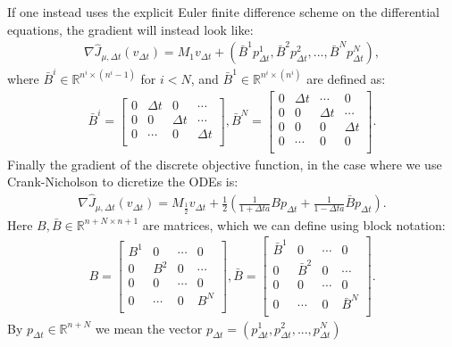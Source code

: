 \begin{theorem}
If one instead uses the explicit Euler finite difference scheme on the differential equations, the gradient will instead look like:
\begin{align}
\nabla\hat J_{\mu,\Delta t}(v_{\Delta t})= M_{1}v_{\Delta t} + (\bar B^1p_{\Delta t}^1,\bar B^2p_{\Delta t}^2,...,\bar B^Np_{\Delta t}^N),
\end{align}
where $\bar B^i\in \mathbb{R}^{n^i\times (n^i-1)}$ for $i<N$, and $\bar B^1\in \mathbb{R}^{n^i\times (n^i)}$ are defined as:
\begin{align*}
\bar B^i = \left[ \begin{array}{cccc}  
   0 &\Delta t& 0 & \cdots  \\ 
   0 &0 & \Delta t  & \cdots \\
   0 &\cdots &  0& \Delta t   \\
   \end{array}  \right] ,
\bar B^N = \left[ \begin{array}{cccc}
   0& \Delta t & \cdots & 0 \\  
   0& 0 & \Delta t & \cdots \\ 
   0 & 0& 0  & \Delta t \\
   0 &\cdots & 0& 0   \\
   \end{array}  \right].   
\end{align*}
Finally the gradient of the discrete objective function, in the case where we use Crank-Nicholson to dicretize the ODEs is:
\begin{align*}
\nabla\hat J_{\mu,\Delta t}(v_{\Delta t})= M_{\frac{1}{2}}v_{\Delta t} + \frac{1}{2}(\frac{1}{1+\Delta t a} Bp_{\Delta t} + \frac{1}{1-\Delta t a}\bar{B}p_{\Delta t}).
\end{align*}  
Here $B,\bar{B}\in\mathbb{R}^{n+N\times n+1}$ are matrices, which we can define using block notation:
\begin{align*}
B = \left[ \begin{array}{cccc}
   B^1& 0 & \cdots & 0 \\  
   0& B^2 & 0 & \cdots \\ 
   0 & 0& \cdots  & 0 \\
   0 &\cdots & 0& B^N   \\
   \end{array}  \right],
\bar B = \left[ \begin{array}{cccc}
   \bar B^1& 0 & \cdots & 0 \\  
   0& \bar B^2 & 0 & \cdots \\ 
   0 & 0& \cdots  & 0 \\
   0 &\cdots & 0& \bar B^N   \\
   \end{array}  \right].
\end{align*}
By $p_{\Delta t}\in\mathbb{R}^{n+N}$ we mean the vector $p_{\Delta t}=(p_{\Delta t}^1,p_{\Delta t}^2,...,p_{\Delta t}^N)$
\end{theorem}
